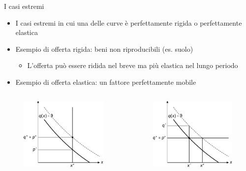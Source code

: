 \documentclass[11pt]{beamer}
\begin{document}
\begin{frame}{I casi estremi}
\begin{itemize}
\item I casi estremi in cui una delle curve è perfettamente rigida o perfettamente elastica
\item Esempio di offerta rigida: beni non riproducibili (es. suolo)
\begin{itemize}
\item L'offerta può essere ridida nel breve ma più elastica nel lungo periodo
\end{itemize}
\item Esempio di offerta elastica: un fattore perfettamente mobile
\end{itemize}

\begin{columns}
\begin{column}{.5\columnwidth}
\begin{figure}[htbp]
\centering
\includegraphics[width=.8\textwidth]{./figure/incidenza-7.pdf}
\end{figure}
\end{column}

\begin{column}{.5\columnwidth}
\begin{figure}[htbp]
\centering
\includegraphics[width=.8\textwidth]{./figure/incidenza-8.pdf}
\end{figure}
\end{column}
\end{columns}
\end{frame}
\end{document}
